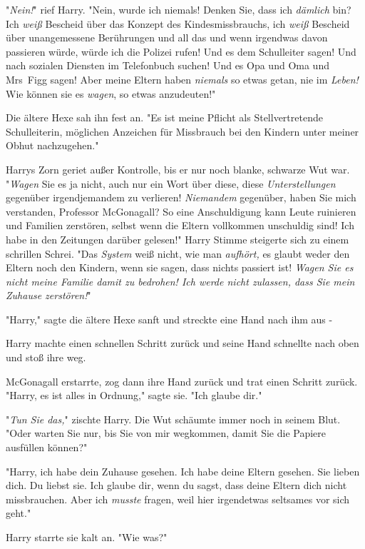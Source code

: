 {"\emph{Nein!}" rief Harry. "Nein, wurde ich niemals! Denken Sie, dass ich \emph{dämlich} bin? Ich \emph{weiß} Bescheid über das Konzept des Kindesmissbrauchs, ich \emph{weiß} Bescheid über unangemessene Berührungen und all das und wenn irgendwas davon passieren würde, würde ich die Polizei rufen! Und es dem Schulleiter sagen! Und nach sozialen Diensten im Telefonbuch suchen! Und es Opa und Oma und Mrs~Figg sagen! Aber meine Eltern haben \emph{niemals} so etwas getan, nie im \emph{Leben!} Wie können sie es \emph{wagen}, so etwas anzudeuten!"

Die ältere Hexe sah ihn fest an. "Es ist meine Pflicht als Stellvertretende Schulleiterin, möglichen Anzeichen für Missbrauch bei den Kindern unter meiner Obhut nachzugehen."

Harrys Zorn geriet außer Kontrolle, bis er nur noch blanke, schwarze Wut war. "\emph{Wagen} Sie es ja nicht, auch nur ein Wort über diese, diese \emph{Unterstellungen} gegenüber irgendjemandem zu verlieren! \emph{Niemandem} gegenüber, haben Sie mich verstanden, Professor McGonagall? So eine Anschuldigung kann Leute ruinieren und Familien zerstören, selbst wenn die Eltern vollkommen unschuldig sind! Ich habe in den Zeitungen darüber gelesen!" Harry Stimme steigerte sich zu einem schrillen Schrei. "Das \emph{System} weiß nicht, wie man \emph{aufhört,} es glaubt weder den Eltern noch den Kindern, wenn sie sagen, dass nichts passiert ist! \emph{Wagen Sie es nicht meine Familie damit zu bedrohen! Ich werde nicht zulassen, dass Sie mein} \emph{Zuhause zerstören!}"

"Harry," sagte die ältere Hexe sanft und streckte eine Hand nach ihm aus -

Harry machte einen schnellen Schritt zurück und seine Hand schnellte nach oben und stoß ihre weg.

McGonagall erstarrte, zog dann ihre Hand zurück und trat einen Schritt zurück. "Harry, es ist alles in Ordnung," sagte sie. "Ich glaube dir."

"\emph{Tun Sie das,}" zischte Harry. Die Wut schäumte immer noch in seinem Blut. "Oder warten Sie nur, bis Sie von mir wegkommen, damit Sie die Papiere ausfüllen können?"

"Harry, ich habe dein Zuhause gesehen. Ich habe deine Eltern gesehen. Sie lieben dich. Du liebst sie. Ich glaube dir, wenn du sagst, dass deine Eltern dich nicht missbrauchen. Aber ich \emph{musste} fragen, weil hier irgendetwas seltsames vor sich geht."

Harry starrte sie kalt an. "Wie was?"

}
